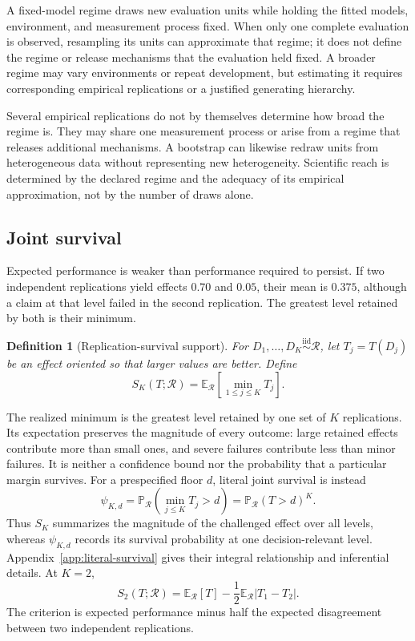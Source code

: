 \documentclass[11pt]{article}
\newcommand{\Regime}{\mathcal{R}}
\newcommand{\E}{\mathbb{E}}
\newcommand{\Prb}{\mathbb{P}}
\newcommand{\iid}{\mathrel{\overset{\mathrm{iid}}{\sim}}}
\newtheorem{definition}{Definition}
\theoremstyle{remark}
\begin{document}
A fixed-model regime draws new evaluation units while holding the fitted models, environment, and measurement process fixed. When only one complete evaluation is observed, resampling its units can approximate that regime; it does not define the regime or release mechanisms that the evaluation held fixed. A broader regime may vary environments or repeat development, but estimating it requires corresponding empirical replications or a justified generating hierarchy.

Several empirical replications do not by themselves determine how broad the regime is. They may share one measurement process or arise from a regime that releases additional mechanisms. A bootstrap can likewise redraw units from heterogeneous data without representing new heterogeneity. Scientific reach is determined by the declared regime and the adequacy of its empirical approximation, not by the number of draws alone.

\subsection{Joint survival}

Expected performance is weaker than performance required to persist. If two independent replications yield effects $0.70$ and $0.05$, their mean is $0.375$, although a claim at that level failed in the second replication. The greatest level retained by both is their minimum.

\begin{definition}[Replication-survival support]
For $D_1,\ldots,D_K\iid\Regime$, let $T_j=T(D_j)$ be an effect oriented so that larger values are better. Define
\begin{equation}
S_K(T;\Regime)
=
\E_{\Regime}\left[
\min_{1\leq j\leq K}T_j
\right].
\label{eq:support}
\end{equation}
\end{definition}

The realized minimum is the greatest level retained by one set of $K$ replications. Its expectation preserves the magnitude of every outcome: large retained effects contribute more than small ones, and severe failures contribute less than minor failures. It is neither a confidence bound nor the probability that a particular margin survives. For a prespecified floor $d$, literal joint survival is instead
\[
\psi_{K,d}
=
\Prb_{\Regime}\left(\min_{j\leq K}T_j>d\right)
=
\Prb_{\Regime}(T>d)^K.
\]
Thus $S_K$ summarizes the magnitude of the challenged effect over all levels, whereas $\psi_{K,d}$ records its survival probability at one decision-relevant level. Appendix~\ref{app:literal-survival} gives their integral relationship and inferential details. At $K=2$,
\begin{equation}
S_2(T;\Regime)
=
\E_{\Regime}[T]
-
\frac12\E_{\Regime}|T_1-T_2|.
\label{eq:k2}
\end{equation}
The criterion is expected performance minus half the expected disagreement between two independent replications.
\end{document}
